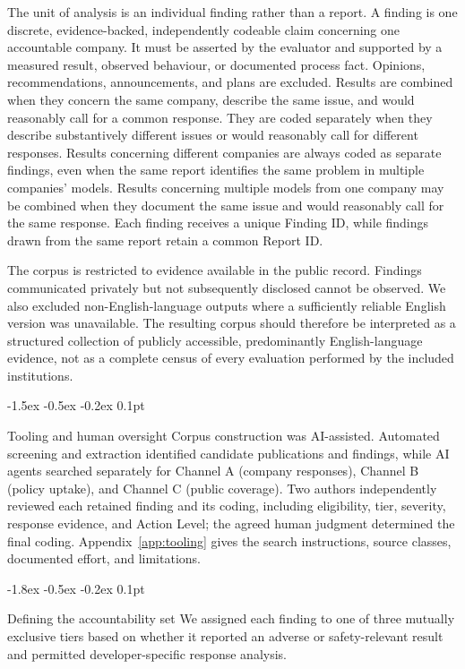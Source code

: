 \documentclass{article}
\makeatletter
\renewcommand{\subsection}{%
  \@startsection{subsection}{2}{\z@}%
                {-1.8ex \@plus -0.5ex \@minus -0.2ex}%
                {0.1pt}%
                {\normalsize\bf\raggedright}%
}
\renewcommand{\subsubsection}{%
  \@startsection{subsubsection}{3}{\z@}%
                {-1.5ex \@plus -0.5ex \@minus -0.2ex}%
                {0.1pt}%
                {\normalsize\bf\raggedright}%
}
\makeatother
\begin{document}
The unit of analysis is an individual finding rather than a report. A finding is one discrete, evidence-backed, independently codeable claim concerning one accountable company. It must be asserted by the evaluator and supported by a measured result, observed behaviour, or documented process fact. Opinions, recommendations, announcements, and plans are excluded. Results are combined when they concern the same company, describe the same issue, and would reasonably call for a common response. They are coded separately when they describe substantively different issues or would reasonably call for different responses. Results concerning different companies are always coded as separate findings, even when the same report identifies the same problem in multiple companies' models. Results concerning multiple models from one company may be combined when they document the same issue and would reasonably call for the same response. Each finding receives a unique Finding ID, while findings drawn from the same report retain a common Report ID.

The corpus is restricted to evidence available in the public record. Findings communicated privately but not subsequently disclosed cannot be observed. We also excluded non-English-language outputs where a sufficiently reliable English version was unavailable. The resulting corpus should therefore be interpreted as a structured collection of publicly accessible, predominantly English-language evidence, not as a complete census of every evaluation performed by the included institutions.

\subsubsection{Tooling and human oversight}\label{sec:tooling-overview}
Corpus construction was AI-assisted. Automated screening and extraction identified candidate publications and findings, while AI agents searched separately for Channel A (company responses), Channel B (policy uptake), and Channel C (public coverage). Two authors independently reviewed each retained finding and its coding, including eligibility, tier, severity, response evidence, and Action Level; the agreed human judgment determined the final coding. Appendix~\ref{app:tooling} gives the search instructions, source classes, documented effort, and limitations.

\subsection{Defining the accountability set}\label{sec:accountability}
We assigned each finding to one of three mutually exclusive tiers based on whether it reported an adverse or safety-relevant result and permitted developer-specific response analysis.
\end{document}

